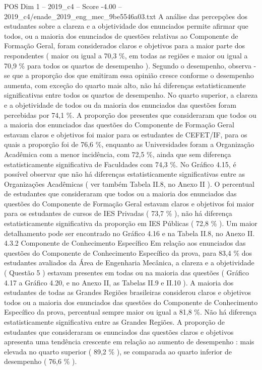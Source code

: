 \begin{textsample}{POS Dim 1 – 2019\_c4 – Score -4.00 – 2019\_c4/enade\_2019\_eng\_mec\_9be5546a03.txt}
A análise das percepções dos estudantes sobre a clareza e a objetividade dos enunciados permite afirmar que todos, ou a maioria dos enunciados de questões relativas ao Componente de Formação Geral, foram considerados claros e objetivos para a maior parte dos respondentes ( maior ou igual a 70,3 \%, em todas as regiões e maior ou igual a 70,9 \% para todos os quartos de desempenho ).
Segundo o desempenho, observa -se que a proporção dos que emitiram essa opinião cresce conforme o desempenho aumenta, com exceção do quarto mais alto, não há diferenças estatisticamente significativas entre todos os quartos de desempenho.
No quarto superior, a clareza e a objetividade de todos ou da maioria dos enunciados das questões foram percebidas por 74,1 \%.
A proporção dos presentes que consideraram que todos ou a maioria dos enunciados das questões do Componente de Formação Geral estavam claros e objetivos foi maior para os estudantes de CEFET/IF, para os quais a proporção foi de 76,6 \%, enquanto as Universidades foram a Organização Acadêmica com a menor incidência, com 72,5 \%, ainda que sem diferença estatisticamente significativa de Faculdades com 74,3 \%.
No Gráfico 4.15, é possível observar que não há diferenças estatisticamente significativas entre as Organizações Acadêmicas ( ver também Tabela II.8, no Anexo II ).
O percentual de estudantes que consideraram que todos ou a maioria dos enunciados das questões do Componente de Formação Geral estavam claros e objetivos foi maior para os estudantes de cursos de IES Privadas ( 73,7 \% ), não há diferença estatisticamente significativa da proporção em IES Públicas ( 72,8 \% ).
Um maior detalhamento pode ser encontrado no Gráfico 4.16 e na Tabela II.8, no Anexo II. 4.3.2 Componente de Conhecimento Específico Em relação aos enunciados das questões do Componente de Conhecimento Específico da prova, para 83,4 \% dos estudantes avaliados da Área de Engenharia Mecânica, a clareza e a objetividade ( Questão 5 ) estavam presentes em todas ou na maioria das questões ( Gráfico 4.17 a Gráfico 4.20, e no Anexo II, as Tabelas II.9 e II.10 ).
A maioria dos estudantes de todas as Grandes Regiões brasileiras considerou claros e objetivos todos ou a maioria dos enunciados das questões do Componente de Conhecimento Específico da prova, percentual sempre maior ou igual a 81,8 \%.
Não há diferença estatisticamente significativa entre as Grandes Regiões.
A proporção de estudantes que consideraram os enunciados das questões claros e objetivos apresenta uma tendência crescente em relação ao aumento de desempenho : mais elevada no quarto superior ( 89,2 \% ), se comparada ao quarto inferior de desempenho ( 76,6 \% ).

\end{textsample}
